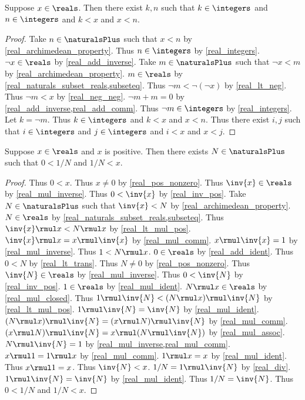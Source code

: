 \begin{theorem}\label{real_generalized_archimedean_property}
    Suppose $x\in\reals$.
    Then there exist $k, n$ such that $k\in\integers$ and $n\in\integers$ and $k < x$ and $x < n$.
\end{theorem}
\begin{proof}
    Take $n\in\naturalsPlus$ such that $x < n$ by \cref{real_archimedean_property}.
    Thus $n\in\integers$ by \cref{real_integers}.
    $\neg{x}\in\reals$ by \cref{real_add_inverse}.
    Take $m\in\naturalsPlus$ such that $\neg{x} < m$ by \cref{real_archimedean_property}.
    $m\in\reals$ by \cref{real_naturals_subset_reals,subseteq}.
    Thus $\neg{m} < \neg{(\neg{x})}$ by \cref{real_lt_neg}.
    Thus $\neg{m} < x$ by \cref{real_neg_neg}.
    $\neg{m} + m = 0$ by \cref{real_add_inverse,real_add_comm}.
    Thus $\neg{m}\in\integers$ by \cref{real_integers}.
    Let $k = \neg{m}$.
    Thus $k\in\integers$ and $k < x$ and $x < n$.
    Thus there exist $i, j$ such that $i\in\integers$ and $j\in\integers$ and $i < x$ and $x < j$.
\end{proof}

\begin{theorem}\label{real_small_reciprocal}
    Suppose $x\in\reals$ and $x$ is positive.
    Then there exists $N\in\naturalsPlus$ such that $0 < 1 / N$ and $1 / N < x$.
\end{theorem}
\begin{proof}
    Thus $0 < x$.
    Thus $x \neq 0$ by \cref{real_pos_nonzero}.
    Thus $\inv{x}\in\reals$ by \cref{real_mul_inverse}.
    Thus $0 < \inv{x}$ by \cref{real_inv_pos}.
    Take $N\in\naturalsPlus$ such that $\inv{x} < N$ by \cref{real_archimedean_property}.
    $N\in\reals$ by \cref{real_naturals_subset_reals,subseteq}.
    Thus $\inv{x} \rmul x < N \rmul x$ by \cref{real_lt_mul_pos}.
    $\inv{x} \rmul x = x \rmul \inv{x}$ by \cref{real_mul_comm}.
    $x \rmul \inv{x} = 1$ by \cref{real_mul_inverse}.
    Thus $1 < N \rmul x$.
    $0\in\reals$ by \cref{real_add_ident}.
    Thus $0 < N$ by \cref{real_lt_trans}.
    Thus $N \neq 0$ by \cref{real_pos_nonzero}.
    Thus $\inv{N}\in\reals$ by \cref{real_mul_inverse}.
    Thus $0 < \inv{N}$ by \cref{real_inv_pos}.
    $1\in\reals$ by \cref{real_mul_ident}.
    $N \rmul x\in\reals$ by \cref{real_mul_closed}.
    Thus $1 \rmul \inv{N} < (N \rmul x) \rmul \inv{N}$ by \cref{real_lt_mul_pos}.
    $1 \rmul \inv{N} = \inv{N}$ by \cref{real_mul_ident}.
    $(N \rmul x) \rmul \inv{N} = (x \rmul N) \rmul \inv{N}$ by \cref{real_mul_comm}.
    $(x \rmul N) \rmul \inv{N} = x \rmul (N \rmul \inv{N})$ by \cref{real_mul_assoc}.
    $N \rmul \inv{N} = 1$ by \cref{real_mul_inverse,real_mul_comm}.
    $x \rmul 1 = 1 \rmul x$ by \cref{real_mul_comm}.
    $1 \rmul x = x$ by \cref{real_mul_ident}.
    Thus $x \rmul 1 = x$.
    Thus $\inv{N} < x$.
    $1 / N = 1 \rmul \inv{N}$ by \cref{real_div}.
    $1 \rmul \inv{N} = \inv{N}$ by \cref{real_mul_ident}.
    Thus $1 / N = \inv{N}$.
    Thus $0 < 1 / N$ and $1 / N < x$.
\end{proof}

